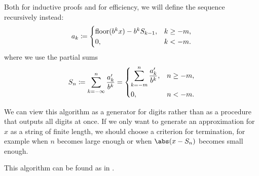 \begin{algorithm}
\begin{thmenum}
     Both for inductive proofs and for efficiency, we will define the sequence recursively instead:
    \begin{equation}\label{eq:alg:real_number_radix_expansion/recursive}
      a_k \coloneqq \begin{cases}
        \operatorname{floor}(b^k x) - b^k S_{k - 1}, &k \geq -m, \\
        0,                             &k < -m.
      \end{cases}
    \end{equation}
    where we use the partial sums
    \begin{equation*}
      S_n
      \coloneqq
      \sum_{k=-\infty}^n \frac {a'_k} {b^k}
      =
      \begin{dcases}
        \sum_{k=-m}^n \frac {a'_k} {b^k}, &n \geq -m, \\
        0,                                &n < -m.
      \end{dcases}
    \end{equation*}
  \end{thmenum}
\end{algorithm}
\begin{comments}
  \item We can view this algorithm as a generator for digits rather than as a procedure that outputs all digits at once. If we only want to generate an approximation for \( x \) as a string of finite length, we should choose a criterion for termination, for example when \( n \) becomes large enough or when \( \abs(x - S_n) \) becomes small enough.

  \item This algorithm can be found as  in \cite{notebook:code}.
\end{comments}
